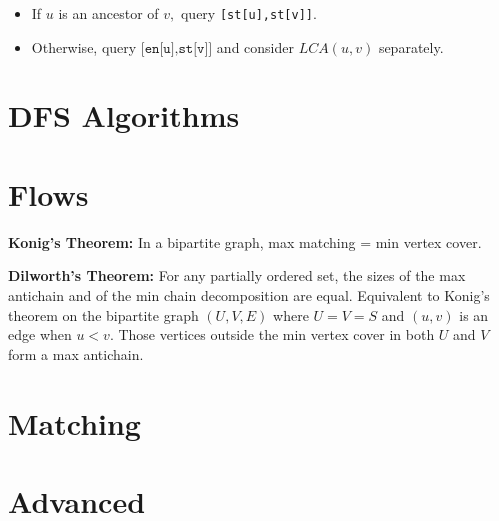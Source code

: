 		\begin{itemize}
		\item If $u$ is an ancestor of $v,$ query \texttt{[st[u],st[v]]}.
		\item Otherwise, query $\texttt{[en[u],st[v]]}$ and consider $LCA(u,v)$ separately.
		\end{itemize}

\section{DFS Algorithms}


\section{Flows}

	\textbf{Konig's Theorem:} In a bipartite graph, max matching = min vertex cover.

	\textbf{Dilworth's Theorem:} For any partially ordered set, the sizes of the max antichain and of the min chain decomposition are equal. Equivalent to Konig's theorem on the bipartite graph $(U,V,E)$ where $U=V=S$ and $(u,v)$ is an edge when $u<v$. Those vertices outside the min vertex cover in both $U$ and $V$ form a max antichain.




\section{Matching}


\section{Advanced}

